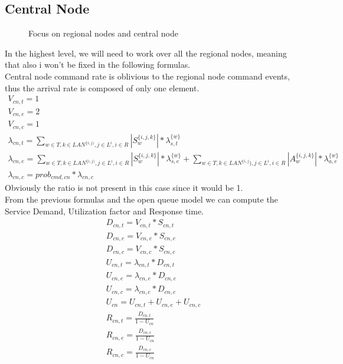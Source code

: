 \documentclass[11pt]{article}
\begin{document}
\subsection{Central Node}
\begin{figure}[H]
	\centering
	\hspace*{-3.7cm}
	\frame{}
	\caption{Focus on regional nodes and central node}
\end{figure}
In the highest level, we will need to work over all the regional nodes, meaning that also i won't be fixed in the following formulas.\\
Central node command rate is oblivious to the regional node command events, thus the arrival rate is composed of only one element.
\begin{equation}
	\begin{array}{l}
		V_{cn, t} = 1 \\
		V_{cn, e} = 2 \\ %
		V_{cn,c} = 1 \\
        \lambda_{cn, t} = \sum\limits_{w \in T,k \in LAN^{\{i,j)},j \in L^i, i \in R}{| S^{\{i,j,k\}}_{w} | * \lambda^{\{w\}}_{s, t}}  \\
        \lambda_{cn, e} = \sum\limits_{w \in T,k \in LAN^{\{i,j)},j \in L^i, i \in R}{| S^{\{i,j,k\}}_{w} | * \lambda^{\{w\}}_{s, e}} + \sum\limits_{w \in T,k \in LAN^{\{i,j}),j \in L^i, i \in R}{| A^{\{i,j,k\}}_{w} | * \lambda^{\{w\}}_{a, e}}\\
		\lambda_{cn, c} = prob_{cmd,cn} * \lambda_{cn, c}
	\end{array}
\end{equation}
Obviously the ratio is not present in this case since it would be 1.\\
From the previous formulas and the open queue model we can compute the Service Demand, Utilization factor and Response time.
\begin{equation}
	\begin{array}{l}
		D_{cn, t} = V_{cn, t} * S_{cn, t} \\
		D_{cn, e} = V_{cn, e} * S_{cn, e} \\
		D_{cn, c} = V_{cn, c} * S_{cn, c} \\
		U_{cn, t} = \lambda_{cn, t} * D_{cn, t} \\
		U_{cn, e} = \lambda_{cn, e} * D_{cn, e} \\
		U_{cn, c} = \lambda_{cn, c} * D_{cn, c} \\
		U_{cn} = U_{cn, t} + U_{cn, e} + U_{cn, c} \\
		R_{cn, t} = \frac{D_{cn, t}}{1 - U_{cn}} \\
		R_{cn, e} = \frac{D_{cn, e}}{1 - U_{cn}} \\
		R_{cn, c} = \frac{D_{cn, c}}{1 - U_{cn}} \\
	\end{array}
\end{equation}
\end{document}

